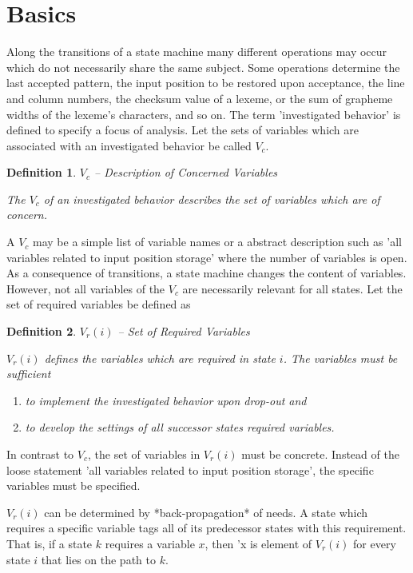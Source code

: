 \documentclass[12pt,a4paper]{scrartcl}
\newtheorem{definition}{Definition}
\begin{document}
\section{Basics}

Along the transitions of a state machine many different operations may occur
which do not necessarily share the same subject. Some operations determine the
last accepted pattern, the input position to be restored upon acceptance, the
line and column numbers, the checksum value of a lexeme, or the sum of grapheme
widths of the lexeme's characters, and so on. The term 'investigated behavior'
is defined to specify a focus of analysis.  Let the sets of variables which are
associated with an investigated behavior be called $V_c$.

\begin{definition}
$V_c$ -- Description of Concerned Variables

The $V_c$ of an investigated behavior describes the set of variables which
are of concern. 
\end{definition}

A $V_c$ may be a simple list of variable names or a abstract description such
as 'all variables related to input position storage' where the number of
variables is open.  As a consequence of transitions, a state machine changes
the content of variables. However, not all variables of the $V_c$ are necessarily
relevant for all states. Let the set of required variables be defined as

\begin{definition}
$V_r(i)$ -- Set of Required Variables

$V_r(i)$ defines the variables which are required in state $i$. The
variables must be sufficient

\begin{enumerate}
\item  to implement the investigated behavior upon drop-out and
\item to develop the settings of all successor states required variables.
\end{enumerate}
\end{definition}

In contrast to $V_c$, the set of variables in $V_r(i)$ must be concrete.
Instead of the loose statement 'all variables related to input position
storage', the specific variables must be specified. 

$V_r(i)$ can be determined by *back-propagation* of needs. A state which
requires a specific variable tags all of its predecessor states with this
requirement. That is, if a state $k$ requires a variable $x$, then 'x is
element of $V_r(i)$ for every state $i$ that lies on the path to $k$.
\end{document}
